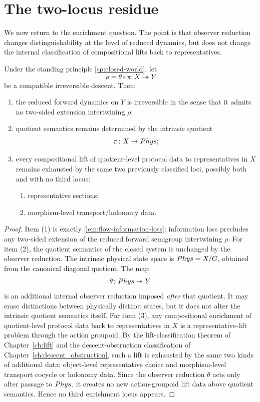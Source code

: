 \section{The two-locus residue}
We now return to the enrichment question. The point is that observer
reduction changes distinguishability at the level of reduced dynamics,
but does not change the internal classification of compositional lifts
back to representatives.
\begin{theorem}
	Under the standing principle \cref{sp:closed-world}, let
	\[
		\rho=\theta\circ\pi\colon X\twoheadrightarrow Y
	\]
	be a compatible irreversible descent.
	Then:
	\begin{enumerate}[label=\textup{(\arabic*)}]
		\item the reduced forward dynamics on \(Y\) is irreversible in the
		      sense that it admits no two-sided extension intertwining \(\rho\);
		\item quotient semantics remains determined by the intrinsic quotient
		      \[
			      \pi\colon X\to Phys;
		      \]
		\item every compositional lift of quotient-level protocol data to
		      representatives in \(X\) remains exhausted by the same two
		      previously classified loci, possibly both and with no third
		      locus:
		      \begin{enumerate}[label=\textup{(\alph*)}]
			      \item representative sections;
			      \item morphism-level transport/holonomy data.
		      \end{enumerate}
	\end{enumerate}
\end{theorem}
\begin{proof}
	Item \textup{(1)} is exactly \cref{lem:flow-information-loss}:
	information loss precludes any two-sided extension of the reduced
	forward semigroup intertwining \(\rho\).
	For item \textup{(2)}, the quotient semantics of the closed system is
	unchanged by the observer reduction. The intrinsic physical state space
	is \(Phys=X/G\), obtained from the canonical diagonal quotient. The map
	\[
		\theta\colon Phys\twoheadrightarrow Y
	\]
	is an additional internal observer reduction imposed \emph{after} that
	quotient. It may erase distinctions between physically distinct states,
	but it does not alter the intrinsic quotient semantics itself.
	For item \textup{(3)}, any compositional enrichment of quotient-level
	protocol data back to representatives in \(X\) is a representative-lift
	problem through the action groupoid. By the lift-classification theorem
	of Chapter~\ref{ch:lift} and the descent-obstruction classification of
	Chapter~\ref{ch:descent_obstruction}, such a lift is exhausted by the
	same two kinds of additional data: object-level representative choice
	and
	morphism-level transport cocycle or holonomy data. Since the observer
	reduction \(\theta\) acts only after passage to \(Phys\), it creates no
	new action-groupoid lift data above quotient semantics. Hence no third
	enrichment locus appears.
\end{proof}
